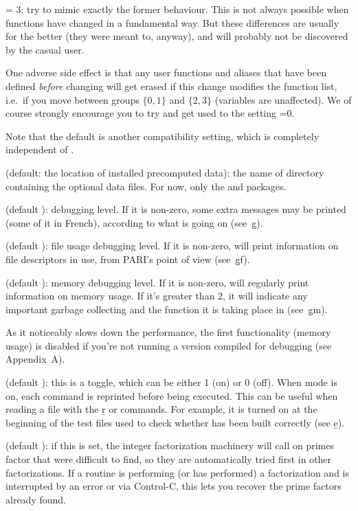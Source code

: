 \quad {} = 3: try to mimic exactly the former behaviour. This
is not always possible when functions have changed in a fundamental way.
But these differences are usually for the better (they were meant to,
anyway), and will probably not be discovered by the casual user.

One adverse side effect is that any user functions and aliases that have
been defined \emph{before} changing  will get erased if this
change modifies the function list, i.e.~if you move between groups
$\{0,1\}$ and $\{2,3\}$ (variables are unaffected). We of course strongly
encourage you to try and get used to the setting =0.

Note that the default  is another compatibility setting,
which is completely independent of .

 (default: the location of installed precomputed data):
the name of directory containing the optional data files. For now,
only the  and  packages.

 (default ): debugging level. If it is non-zero,
some extra messages may be printed (some of it in French), according to
what is going on (see~\b{g}).

 (default ): file usage debugging level. If it
is non-zero,  will print information on file descriptors in use, from
PARI's point of view (see~\b{gf}).

 (default ): memory debugging level. If it is
non-zero,  will regularly print information on memory usage. If it's
greater than 2, it will indicate any important garbage collecting and the
function it is taking place in (see~\b{gm}).

 As it noticeably slows down the performance,
the first functionality (memory usage) is disabled if you're not running a
version compiled for debugging (see Appendix~A).

 (default ): this is a toggle, which can be either 1
(on) or 0 (off). When  mode is on, each command is reprinted before
being executed. This can be useful when reading a file with the \b{r} or
 commands. For example, it is turned on at the beginning of the
test files used to check whether  has been built correctly (see
\b{e}).

 (default ): if this is set, the integer
factorization machinery will call  on primes
factor that were difficult to find, so they are automatically tried first in
other factorizations. If a routine is performing (or has performed) a
factorization and is interrupted by an error or via Control-C, this lets you
recover the prime factors already found.

